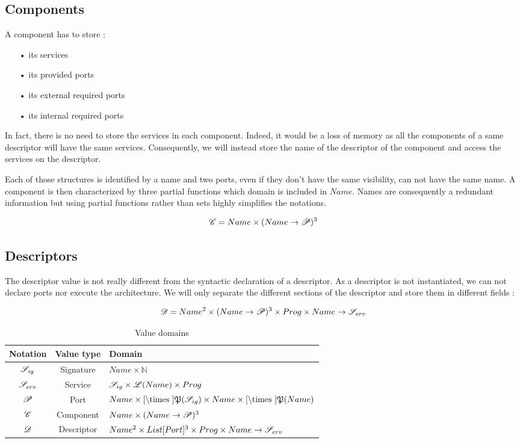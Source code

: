 \subsection{Components}
\label{component_value}
A component has to store :
\begin{itemize}
\item[•] its services
\item[•] its provided ports
\item[•] its external required ports
\item[•] its internal required ports
\end{itemize}

In fact, there is no need to store the services in each component. Indeed, it would be a loss of memory as all the components of a same descriptor will have the same services. Consequently, we will instead store the name of the descriptor of the component and access the services on the descriptor.

Each of those structures is identified by a name and two ports, even if they don't have the same visibility, can not have the same name. A component is then characterized by three partial functions which domain is included in $Name$. Names are consequently a redundant information but using partial functions rather than sets highly simplifies  the notations.

\[\mathcal{C}= Name \times (Name \rightarrow \mathcal{P})^3\]



\subsection{Descriptors}
The descriptor value is not really different from the syntactic declaration of a descriptor. As a descriptor is not instantiated, we can not declare ports nor execute the architecture. We will only separate the different sections of the descriptor and store them in different fields : 

\[\mathcal{D} = Name^2 \times (Name \rightarrow \mathcal{P})^3 \times Prog \times Name\rightarrow \mathcal{S}_{erv}\]


\begin{table}[!ht]
\begin{center}
\begin{tabular}{|c|c|l|}

\hline
Notation & Value type & Domain\\
\hline
 $\mathcal{S}_{ig}$  &  Signature & $Name \times \mathbb{N}$\\
 $\mathcal{S}_{erv}$ & Service & $\mathcal{S}_{ig} \times \mathcal{L}(Name) \times Prog$ \\
 $\mathcal{P}$ & Port & $Name \times \Cref \times \mathfrak{P}(\Sig)\times Name \times \Cref \times \mathfrak{P}(Name)$ \\
 $\mathcal{C}$ & Component & $ Name \times (Name \rightarrow \mathcal{P})^3$ \\
 $\mathcal{D}$ &  Descriptor & $ Name^2 \times List[Port]^3 \times Prog \times Name\rightarrow \mathcal{S}_{erv} $\\

\hline
\end{tabular}
\end{center}
\label{tab:DomVal}
\caption{Value domains}
\end{table}

